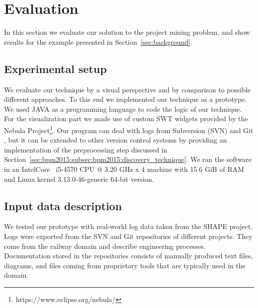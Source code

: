 \section{Evaluation}\label{sec:bpm15:evaluation}

In this section we evaluate our solution to the project mining problem, and show results for the example presented in Section~\ref{sec:background}.

\subsection{Experimental setup}

%

We evaluate our technique by a visual perspective and by comparison to possible different approaches. To this end we implemented our technique as a prototype. We used JAVA as a programming language to code the logic of our technique. For the visualization part we made use of custom SWT widgets provided by the Nebula Project\footnote{https://www.eclipse.org/nebula/}. Our program can deal with logs from Subversion (SVN) \citep{pilato2008version} and Git \citep{torvalds2010git}, but it can be extended to other version control systems by providing an implementation of the preprocessing step discussed in Section~\ref{sec:bpm2015:subsec:bpm2015:discovery_technique}.
We ran the software in an Intel\textregistered Core \texttrademark~i5-4570 CPU @ 3.20 GHz x 4 machine with 15.6 GiB of RAM and Linux kernel 3.13.0-46-generic 64-bit version.

\subsection{Input data description}

We tested our prototype with real-world log data taken from the SHAPE project. Logs were exported from the SVN and Git repositories of different projects. They come from the railway domain and describe engineering processes. Documentation stored in the repositories consists of manually produced text files, diagrams, and files coming from proprietary tools that are typically used in the domain.

